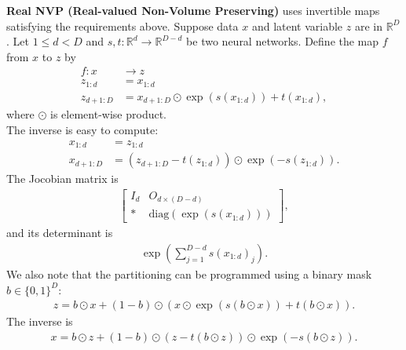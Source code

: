 \documentclass[12pt,oneside]{article}
\newcommand{\ra}[0]{\rightarrow}
\newcommand{\R}[0]{\mathbb{R}}
\newcommand{\set}[1]{\{ #1\}}
\newcommand{\ali}[1]{\begin{align*}#1\end{align*}}
\theoremstyle{plain}
\theoremstyle{remark}
\begin{document}
{\bf Real NVP (Real-valued Non-Volume Preserving)} uses invertible maps satisfying the requirements above. Suppose data $x$ and latent variable $z$ are in $\R^D$. Let $1 \leq d < D$ and $s, t: \R^d \ra \R^{D-d}$ be two neural networks. Define the map $f$ from $x$ to $z$ by
\ali{f: x &\ra z \\
    z_{1:d} &= x_{1:d} \\
    z_{d+1:D} &= x_{d+1:D} \odot \exp(s(x_{1:d})) + t(x_{1:d}),}
where $\odot$ is element-wise product.\\
The inverse is easy to compute:
\ali{x_{1:d} &= z_{1:d} \\
    x_{d+1:D} &= (z_{d+1:D} - t(z_{1:d})) \odot \exp(-s(z_{1:d})).}
The Jocobian matrix is 
\ali{\begin{bmatrix} I_d & O_{d \times (D-d)} \\ * & \text{diag}(\exp(s(x_{1:d}))) \end{bmatrix},}
and its determinant is 
\ali{\exp\left(\sum_{j=1}^{D-d} s(x_{1:d})_j\right).}
We also note that the partitioning can be programmed using a binary mask $b \in \set{0, 1}^D$: 
\ali{ z = b \odot x + (1 - b) \odot \left(x \odot \exp(s(b \odot x)) + t(b \odot x)\right).}
The inverse is 
\ali{x = b \odot z + (1- b) \odot (z - t(b \odot z)) \odot \exp(-s(b \odot z)).}
\end{document}
